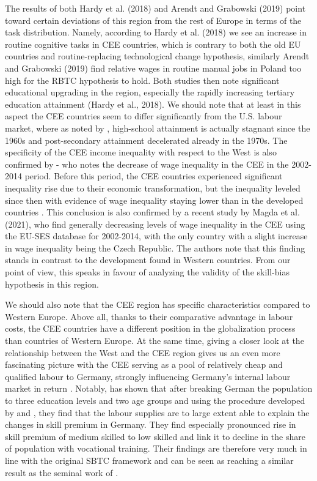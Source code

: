 \documentclass[11pt]{article}
\begin{document}
The results of both Hardy et al. (2018) and Arendt and Grabowski (2019) point toward certain deviations of this region from the rest of Europe in terms of the task distribution. Namely, according to Hardy et al. (2018) we see an increase in routine cognitive tasks in CEE countries, which is contrary to both the old EU countries and routine-replacing technological change hypothesis, similarly Arendt and Grabowski (2019) find relative wages in routine manual jobs in Poland too high for the RBTC hypothesis to hold. Both studies then note significant educational upgrading in the region, especially the rapidly increasing tertiary education attainment (Hardy et al., 2018). We should note that at least in this aspect the CEE countries seem to differ significantly from the U.S. labour market, where as noted by \citet{acemoglu2012does}, high-school attainment is actually stagnant since the 1960s and post-secondary attainment decelerated already in the 1970s. The specificity of the CEE income inequality with respect to the West is also confirmed by \citet{magda2021firms} - who notes the decrease of wage inequality in the CEE in the 2002-2014 period. Before this period, the CEE countries experienced significant inequality rise due to their economic transformation, but the inequality leveled since then \citep{tyrowicz2019wage} with evidence of wage inequality staying lower than in the developed countries \citep{mysikova2018personal}. This conclusion is also confirmed by a recent study by Magda et al. (2021), who find generally decreasing levels of wage inequality in the CEE using the EU-SES database for 2002-2014, with the only country with a slight increase in wage inequality being the Czech Republic. The authors note that this finding stands in contrast to the development found in Western countries. From our point of view, this speaks in favour of analyzing the validity of the skill-bias hypothesis in this region.

We should also note that the CEE region has specific characteristics compared to Western Europe. Above all, thanks to their comparative advantage in labour costs, the CEE countries have a different position in the globalization process than countries of Western Europe. At the same time, giving a closer look at the relationship between the West and the CEE region gives us an even more fascinating picture with the CEE serving as a pool of relatively cheap and qualified labour to Germany, strongly influencing Germany's internal labour market in return 
\citep{marin2004nation, marin2018global}. 
Notably, \citet{glitz2021skill} has shown that after breaking German the population to three education levels and two age groups and using the procedure developed by \citet{katz1992changes} and \citet{card2001can}, they find that the labour supplies are to large extent able to explain the changes in skill premium in Germany. They find especially pronounced rise in skill premium of medium skilled to low skilled and link it to decline in the share of population with vocational training. Their findings are therefore very much in line with the original SBTC framework and can be seen as reaching a similar result as the seminal work of \citet{goldin2010race}.
\end{document}
